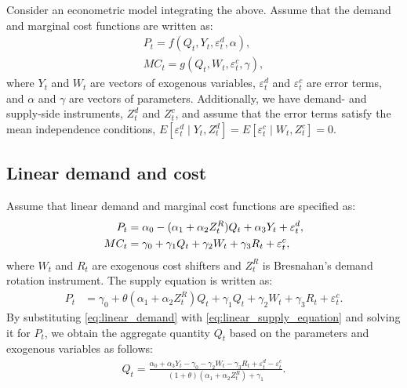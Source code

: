 \documentclass[11pt, a4paper]{article}
\begin{document}
Consider an econometric model integrating the above.
Assume that the demand and marginal cost functions are written as: 
\begin{align}
    P_{t} = f(Q_{t}, Y_{t}, \varepsilon^{d}_{t}, \alpha), \label{eq:demand}\\
    MC_{t} = g(Q_{t}, W_{t}, \varepsilon^{c}_{t}, \gamma),\label{eq:marginal_cost}
\end{align}
where $Y_{t}$ and $W_{t}$ are vectors of exogenous variables, $\varepsilon^{d}_{t}$ and $\varepsilon^{c}_{t}$ are error terms, and $\alpha$ and $\gamma$ are vectors of parameters.
Additionally, we have demand- and supply-side instruments, $Z^{d}_{t}$ and $Z^{c}_{t}$, and assume that the error terms satisfy the mean independence conditions, $E[\varepsilon^{d}_{t}\mid Y_{t}, Z^{d}_{t}] = E[\varepsilon^{c}_{t} \mid W_{t}, Z^{c}_{t}] =0$.

\subsection{Linear demand and cost}
Assume that linear demand and marginal cost functions are specified as:
\begin{align}
    P_{t} &= \alpha_0 - (\alpha_1 + \alpha_2Z^{R}_{t})Q_{t} + \alpha_3 Y_{t} + \varepsilon^{d}_{t},\label{eq:linear_demand}\\
    MC_{t} &= \gamma_0  + \gamma_1 Q_{t} + \gamma_2 W_{t} + \gamma_3 R_{t} + \varepsilon^{c}_{t},\label{eq:linear_{t}arginal_cost}
\end{align}
where $W_{t}$ and $R_{t}$ are exogenous cost shifters and $Z^{R}_{t}$ is Bresnahan's demand rotation instrument. 
The supply equation is written as:
\begin{align}
    P_{t} 
    &= \gamma_0 + \theta (\alpha_1 + \alpha_2 Z^{R}_{t})Q_{t} + \gamma_1 Q_{t} + \gamma_2 W_{t} + \gamma_3 R_{t} +\varepsilon^c_{t}.\label{eq:linear_supply_equation}\end{align}
By substituting \eqref{eq:linear_demand} with \eqref{eq:linear_supply_equation} and solving it for $P_{t}$, we obtain the aggregate quantity $Q_{t}$ based on the parameters and exogenous variables as follows:
\begin{align}
    Q_{t} =  \frac{\alpha_0 + \alpha_3 Y_{t} - \gamma_0 - \gamma_2 W_{t} - \gamma_3 R_{t} + \varepsilon^{d}_{t} - \varepsilon^{c}_{t}}{(1 + \theta) (\alpha_1 + \alpha_2 Z^{R}_{t}) + \gamma_1}.\label{eq:quantity_linear}
\end{align}
\end{document}

